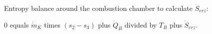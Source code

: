 Entropy balance around the combustion chamber to calculate \( \dot{S}_{erz} \):  

0 equals \( \dot{m}_K \) times \( (s_2 - s_3) \) plus \( \dot{Q}_B \) divided by \( T_B \) plus \( \dot{S}_{erz} \).